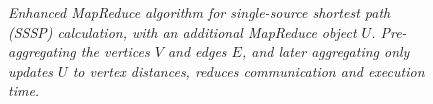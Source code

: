 \begin{figure}[htb]
\begin{center}
{\begin{minipage}{\textwidth}
\begin{tabbing}
  \end{tabbing}
 \end{minipage}}\end{center}

 \caption{\it Enhanced MapReduce algorithm for single-source shortest
 path (SSSP) calculation, with an additional MapReduce object $U$.
 Pre-aggregating the vertices $V$ and edges $E$, and later aggregating
 only updates $U$ to vertex distances, reduces communication and
 execution time.}

 \label{fig:sssp2}
\end{figure}

